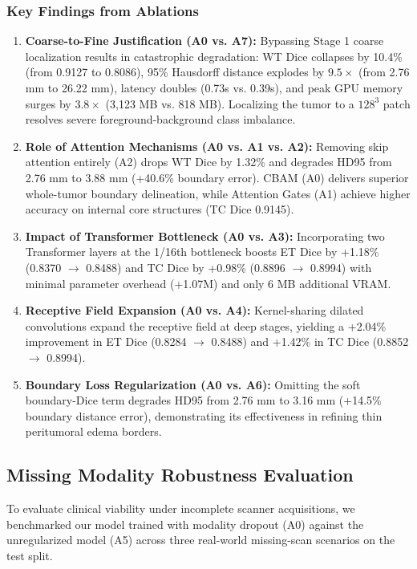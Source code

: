 \documentclass[12pt, a4paper]{article}
\begin{document}
\subsubsection{Key Findings from Ablations}
\begin{enumerate}[leftmargin=*, itemsep=4pt]
    \item \textbf{Coarse-to-Fine Justification (A0 vs. A7):} Bypassing Stage 1 coarse localization results in catastrophic degradation: WT Dice collapses by 10.4\% (from 0.9127 to 0.8086), 95\% Hausdorff distance explodes by $9.5\times$ (from 2.76 mm to 26.22 mm), latency doubles (0.73s vs. 0.39s), and peak GPU memory surges by $3.8\times$ (3,123 MB vs. 818 MB). Localizing the tumor to a $128^3$ patch resolves severe foreground-background class imbalance.
    \item \textbf{Role of Attention Mechanisms (A0 vs. A1 vs. A2):} Removing skip attention entirely (A2) drops WT Dice by 1.32\% and degrades HD95 from 2.76 mm to 3.88 mm (+40.6\% boundary error). CBAM (A0) delivers superior whole-tumor boundary delineation, while Attention Gates (A1) achieve higher accuracy on internal core structures (TC Dice 0.9145).
    \item \textbf{Impact of Transformer Bottleneck (A0 vs. A3):} Incorporating two Transformer layers at the 1/16th bottleneck boosts ET Dice by +1.18\% (0.8370 $\to$ 0.8488) and TC Dice by +0.98\% (0.8896 $\to$ 0.8994) with minimal parameter overhead (+1.07M) and only 6 MB additional VRAM.
    \item \textbf{Receptive Field Expansion (A0 vs. A4):} Kernel-sharing dilated convolutions expand the receptive field at deep stages, yielding a +2.04\% improvement in ET Dice (0.8284 $\to$ 0.8488) and +1.42\% in TC Dice (0.8852 $\to$ 0.8994).
    \item \textbf{Boundary Loss Regularization (A0 vs. A6):} Omitting the soft boundary-Dice term degrades HD95 from 2.76 mm to 3.16 mm (+14.5\% boundary distance error), demonstrating its effectiveness in refining thin peritumoral edema borders.
\end{enumerate}

\subsection{Missing Modality Robustness Evaluation}
To evaluate clinical viability under incomplete scanner acquisitions, we benchmarked our model trained with modality dropout (A0) against the unregularized model (A5) across three real-world missing-scan scenarios on the test split.
\end{document}
